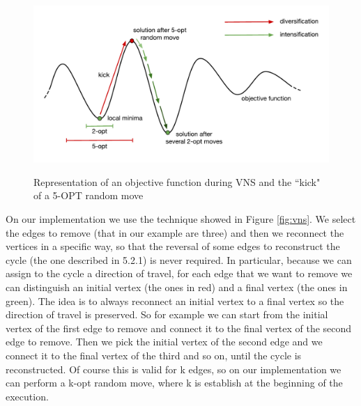 \begin{figure}[h!]
\centering
	\includegraphics[scale=0.77]{media/vns_graph.pdf} \\
	\caption{Representation of an objective function during VNS and the ``kick" of a 5-OPT random move}
\end{figure}

\noindent On our implementation we use the technique showed in Figure \ref{fig:vns}. We select the edges to remove (that in our example are three) and then we reconnect the vertices in a specific way, so that the reversal of some edges to reconstruct the cycle (the one described in 5.2.1) is never required. In particular, because we can assign to the cycle a direction of travel, for each edge that we want to remove we can distinguish an initial vertex (the ones in red) and a final vertex (the ones in green). The idea is to always reconnect an initial vertex to a final vertex so the direction of travel is preserved. So for example we can start from the initial vertex of the first edge to remove and connect it to the final vertex of the second edge to remove. Then we pick the initial vertex of the second edge and we connect it to the final vertex of the third and so on, until the cycle is reconstructed. Of course this is valid for k edges, so on our implementation we can perform a k-opt random move, where k is establish at the beginning of the execution.


